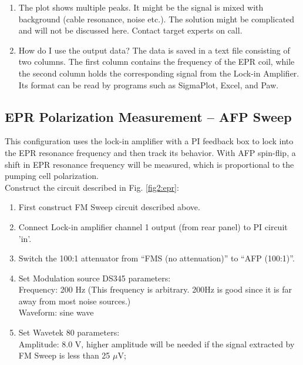 {\begin{enumerate}
\item The plot shows multiple peaks.  It might be the signal is mixed with 
background (cable resonance, noise etc.).  The solution might be complicated
and will not be discussed here.  Contact target experts on call.


\item How do I use the output data? The data is saved in a text
file consisting of two columns.  The first column contains the frequency
of the EPR coil, while the second column holds the corresponding signal from the
Lock-in Amplifier.  Its format can be read by programs such as SigmaPlot, Excel, and Paw.

\end{enumerate}

\subsection{EPR Polarization Measurement -- AFP Sweep}
\label{sec:eprafp}
This configuration uses the lock-in amplifier with a PI feedback 
box to lock into the EPR resonance frequency and then track its
behavior. With AFP spin-flip, a shift in EPR resonance frequency 
will be measured, which is proportional to the pumping cell polarization.\\

Construct the circuit described in Fig. \ref{fig2:epr}:

\begin{enumerate}

\item First construct FM Sweep circuit described above.

\item Connect Lock-in amplifier channel 1 output (from rear panel) to PI circuit 'in'.

\item Switch the 100:1 attenuator from ``FMS (no attenuation)'' to 
``AFP (100:1)''.
\item Set Modulation source DS345 parameters:\\
\indent     Frequency: 200 Hz (This frequency is arbitrary.  200Hz is good 
since it is far away from most noise sources.)\\
\indent     Waveform:  sine wave
\item Set Wavetek 80 parameters:\\
\indent Amplitude: 8.0 V, higher amplitude will be needed if the signal extracted by FM Sweep is less
than 25 $\mu$V;\\


\end{enumerate}}
